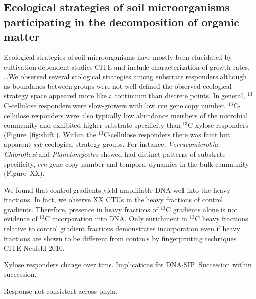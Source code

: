 \subsection{Ecological strategies of soil microorganisms participating in the
    decomposition of organic matter}
\label{sub:ecological_strategies}
Ecological strategies of soil microorganisms have mostly been elucidated by
cultivation-dependent studies CITE and include characterization of growth
rates, \ldots  We observed several ecological strategies among substrate
responders although as boundaries between groups were not well defined the
observed ecological strategy space appeared more like a continuum than discrete
points. In general, $^{13}$C-cellulose responders were slow-growers with low
\textit{rrn} gene copy number. $^{13}$C-cellulose responders were also
typically low abundance members of the microbial community and exhibited higher
substrate specificity than $^{13}$C-xylose responders (Figure~\ref{fig:shift}).
Within the $^{13}$C-cellulose responders there was faint but apparent
\textit{sub}-ecological strategy groups. For instance,
\textit{Verrucomicrobia}, \textit{Chloroflexi} and \textit{Planctomycetes}
showed had distinct patterns of substrate specificity, \textit{rrn} gene copy
number and temporal dynamics in the bulk community (Figure~XX).

We found that control gradients yield amplifiable DNA well into the heavy
fractions. In fact, we observe XX OTUs in the heavy fractions of control
gradients. Therefore, presence in heavy fractions of $^{13}$C gradients alone
is not evidence of $^{13}$C incorporation into DNA. Only enrichment in
$^{13}$C heavy fractions relative to control gradient fractions demonstrates
incorporation even if heavy fractions are shown to be different from controls
by fingerprinting techniques CITE Neufeld 2010.

Xylose responders change over time. Implications for DNA-SIP. Succession within
succession.

Response not consistent across phyla.

